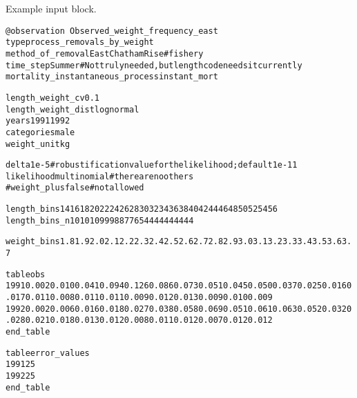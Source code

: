 \documentclass[a4paper,11pt,twoside,pdftex,draft]{article}
\begin{document}
Example input block.

\begin{alltt}
\texttt{@observation Observed\_weight\_frequency\_east}
type process\_removals\_by\_weight
method\_of\_removal EastChathamRise  # fishery
time\_step Summer # Not truly needed, but length code needs it currently
mortality\_instantaneous\_process instant\_mort


length\_weight\_cv 0.1
length\_weight\_dist lognormal
years 1991 1992
categories male
weight\_unit kg

delta 1e-5  # robustification value for the likelihood; default 1e-11
likelihood multinomial	#there are no others
#weight\_plus false        #not allowed

length\_bins 14 16 18 20 22 24 26 28 30 32 34 36 38 40 42 44 46 48 50 52 54 56
length\_bins\_n 10 10 10 9 9 9 8 8 7 7 6 5 4 4 4 4 4 4 4 4 4 4

weight\_bins 1.8 1.9 2.0 2.1 2.2 2.3 2.4 2.5 2.6 2.7 2.8 2.9 3.0 3.1 3.2 3.3 3.4 3.5 3.6 3.7 % 3.8 3.9 4.0 4.1 4.2 4.3 4.4 4.5 4.6 4.7 4.8 4.9 5.0 5.1 5.2 5.3 5.4 5.5 5.6 5.7 5.8 5.9 6.0 6.1 6.2 6.3 6.4 6.5 6.6 6.7 6.8 6.9 7.0 7.1 7.2 7.3 7.4 7.5 7.6 7.7 7.8 7.9 8.0 8.1 8.2 8.3 8.4 8.5 8.6 8.7 8.8 8.9 9.0 9.1 9.2 9.3 9.4 9.5 9.6 9.7 9.8 9.9 10.0 10.1 10.2 10.3 10.4 10.5 10.6 10.7 10.8 10.9 11.0 11.1 11.2 11.3 11.4 11.5 11.6 11.7 11.8

table obs
1991 0.002 0.010 0.041 0.094 0.126 0.086 0.073 0.051 0.045 0.050 0.037 0.025 0.016 0.017 0.011 0.008 0.011 0.011 0.009 0.012 0.013 0.009 0.010 0.009 % 0.0100.0070.0080.0060.0050.0100.0080.0140.0080.0120.0060.0070.0090.0050.0070.0060.0040.0060.0040.0040.0070.0050.0020.0060.0040.0030.0040.0020.0040.0030.0020.0020.0020.0010.0020.0030.0010.0020.0010.0010.0010.0010.0010.0010.0010.0000.0010.0010.0000.0010.0010.0010.0010.0000.0010.0010.0010.0010.0010.0010.0000.0010.0000.0010.0000.0000.0010.0000.0000.0000.0000.0000.0000.0000.0000.001
1992 0.002 0.006 0.016 0.018 0.027 0.038 0.058 0.069 0.051 0.061 0.063 0.052 0.032 0.028 0.021 0.018 0.013 0.012 0.008 0.011 0.012 0.007 0.012 0.012 % 0.0150.0070.0090.0110.0090.0100.0140.0130.0120.0190.0110.0130.0130.0090.0100.0140.0080.0090.0060.0060.0080.0080.0050.0080.0070.0060.0030.0060.0060.0040.0020.0040.0070.0030.0040.0030.0020.0030.0020.0020.0020.0020.0020.0020.0020.0020.0020.0010.0010.0010.0020.0020.0010.0020.0020.0020.0010.0010.0010.0020.0010.0010.0010.0010.0010.0000.0010.0010.0000.0010.0010.0000.0000.0010.0000.001
end\_table

table error\_values
1991 25
1992 25
end\_table
\end{alltt}
\end{document}

